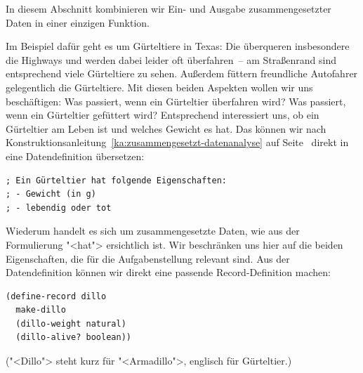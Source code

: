 %
In diesem Abschnitt kombinieren wir Ein- und
Ausgabe zusammengesetzter Daten in einer einzigen Funktion.

Im Beispiel dafür geht es um Gürteltiere in Texas:
Die überqueren insbesondere die Highways
und werden dabei leider oft überfahren~-- am Straßenrand
sind entsprechend viele Gürteltiere zu sehen.  Außerdem füttern
freundliche Autofahrer gelegentlich die Gürteltiere.  Mit diesen
beiden Aspekten wollen wir uns beschäftigen: Was passiert, wenn ein
Gürteltier überfahren wird?  Was passiert, wenn ein Gürteltier
gefüttert wird?  Entsprechend interessiert uns, ob ein Gürteltier am
Leben ist und welches Gewicht es hat.  Das können wir nach
Konstruktionsanleitung~\ref{ka:zusammengesetzt-datenanalyse} auf
Seite~\pageref{ka:zusammengesetzt-datenanalyse} direkt in eine
Datendefinition übersetzen:
%
\begin{lstlisting}
; Ein Gürteltier hat folgende Eigenschaften:
; - Gewicht (in g)
; - lebendig oder tot
\end{lstlisting}
%
Wiederum handelt es sich um zusammengesetzte Daten, wie
aus der Formulierung "<hat"> ersichtlich ist.  Wir beschränken uns
hier auf die beiden Eigenschaften, die für die Aufgabenstellung
relevant sind.
Aus der Datendefinition können wir direkt eine passende
Record-Definition machen:
% 
\begin{lstlisting}
(define-record dillo
  make-dillo
  (dillo-weight natural)
  (dillo-alive? boolean))
\end{lstlisting}
%
("<Dillo"> steht kurz für "<Armadillo">, englisch für Gürteltier.)


